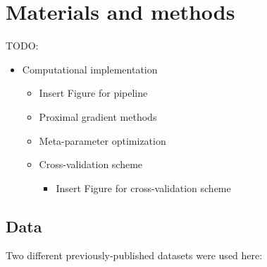 \section*{Materials and methods}

TODO:

\begin{itemize}
  \item Computational implementation
    \begin{itemize}
      \item Insert Figure for pipeline
      \item Proximal gradient methods
      \item Meta-parameter optimization
      \item Cross-validation scheme
        \begin{itemize}
          \item Insert Figure for cross-validation scheme
        \end{itemize}
    \end{itemize}
\end{itemize}


\subsection*{Data}

Two different previously-published datasets were used here:


